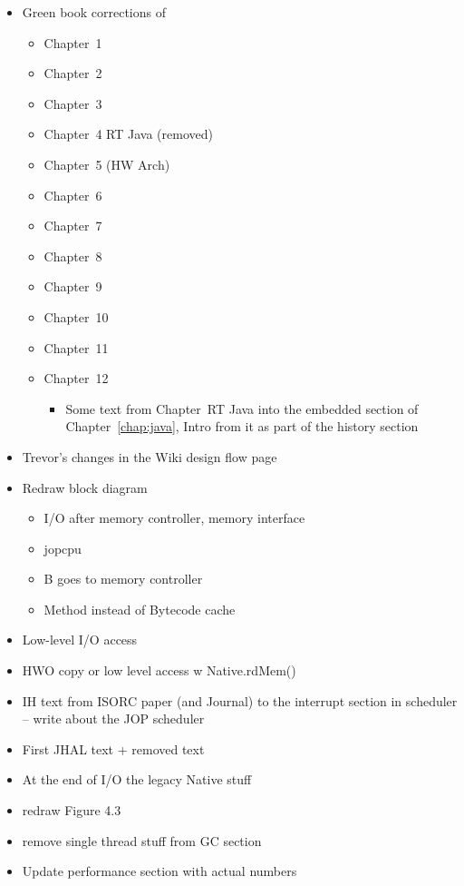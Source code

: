 \begin{itemize}
  \item Green book corrections of
  \begin{itemize}
    \item Chapter~1
    \item Chapter~2
    \item Chapter~3
    \item Chapter~4 RT Java (removed)
    \item Chapter~5 (HW Arch)
    \item Chapter~6
    \item Chapter~7
    \item Chapter~8
    \item Chapter~9
    \item Chapter~10
    \item Chapter~11
    \item Chapter~12
    \begin{itemize}
      \item Some text from Chapter~RT Java into the
          embedded section of Chapter~\ref{chap:java},
          Intro from it as part of the history section
    \end{itemize}
  \end{itemize}
    \item Trevor's changes in the Wiki design flow page
    \item Redraw block diagram
    \begin{itemize}
      \item I/O after memory controller, memory interface
      \item jopcpu
      \item B goes to memory controller
      \item Method instead of Bytecode cache
    \end{itemize}
    \item Low-level I/O access
    \item HWO copy or low level access w Native.rdMem()
    \item IH text from ISORC paper (and Journal) to the
        interrupt section in scheduler -- write about the JOP
        scheduler
    \item First JHAL text + removed text
    \item At the end of I/O the legacy Native stuff
    \item redraw Figure 4.3
    \item remove single thread stuff from GC section
    \item Update performance section with actual numbers

\end{itemize}
